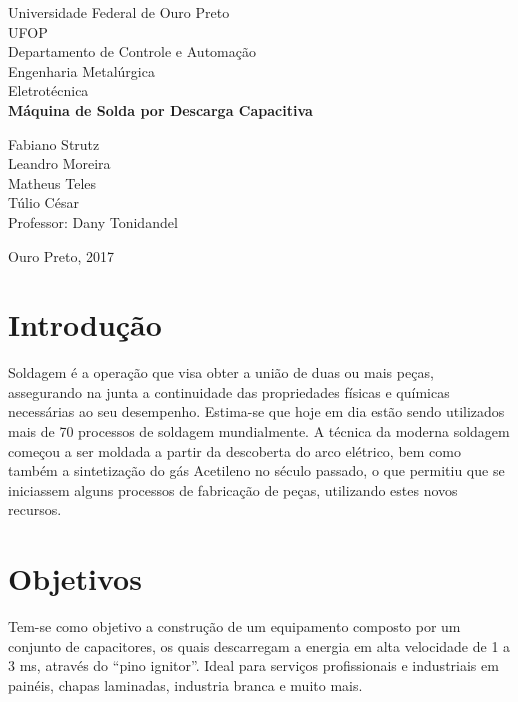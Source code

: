 \documentclass[a4paper,12pt]{article}%
\begin{document}
\begin{titlepage} %
	\begin{center} %
		{\large Universidade Federal de Ouro Preto}\\[0.2cm] %
		{\large UFOP}\\[0.2cm] %
		{\large Departamento de Controle e Automação}\\[0.2cm]
		{\large Engenharia Metalúrgica}\\[0.2cm]
		{\large Eletrotécnica}\\[5.1cm]
		{\bf \huge Máquina de Solda por Descarga Capacitiva}\\[5.1cm] %
	\end{center} %
	{\large Fabiano Strutz\\Leandro Moreira\\Matheus Teles\\Túlio César}\\[0.7cm] %
	{\large Professor: Dany Tonidandel} 
	\begin{center}
		{\large Ouro Preto, 2017}\\[0.2cm]
	\end{center}
\end{titlepage} %
	
	\section{Introdução}
	Soldagem é a operação que visa obter a união de duas ou mais peças, assegurando na junta a continuidade das propriedades físicas
	e químicas necessárias ao seu desempenho.
Estima-se que hoje em dia estão sendo utilizados mais de 70 processos de soldagem mundialmente. 
	A técnica da moderna soldagem começou a ser moldada a partir da descoberta do arco elétrico, bem como também a sintetização do gás Acetileno no século passado, o que permitiu que se iniciassem alguns processos de fabricação de peças, utilizando estes novos recursos.
\pagebreak
	\section{Objetivos}
	Tem-se como objetivo a construção de um equipamento composto por um conjunto de capacitores, os quais descarregam a energia em alta velocidade de 1 a 3 ms, através do “pino ignitor”. Ideal para serviços profissionais e industriais em painéis, chapas laminadas, industria branca e muito mais.
\pagebreak	
\end{document}
